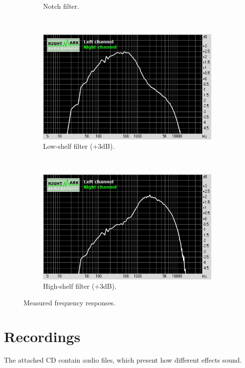 \documentclass[a4paper,twoside,12pt]{book}
\begin{document}
\begin{figure}[h]
\begin{subfigure}[t]{0.45\textwidth}
        \caption{Notch filter.}
    \end{subfigure}
    ~
    \centering
    \begin{subfigure}[t]{0.45\textwidth}
        \includegraphics[width=\textwidth]{images/5_low}
        \caption{Low-shelf filter (+3dB).}
    \end{subfigure}
    ~
    \centering
    \begin{subfigure}[t]{0.45\textwidth}
        \includegraphics[width=\textwidth]{images/6_high}
        \caption{High-shelf filter (+3dB).}
    \end{subfigure}
    \caption{Measured frequency responses.}
    \label{fig:filters}
\end{figure}

\section{Recordings}
The attached CD contain audio files,
which present how different effects sound.
\end{document}

